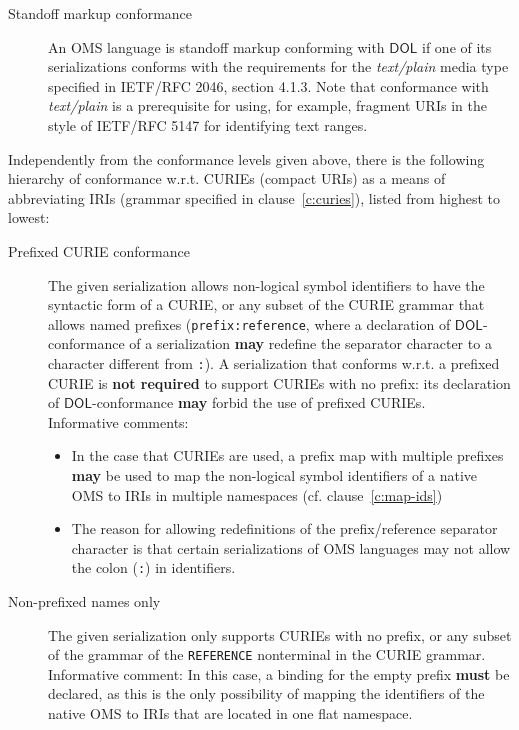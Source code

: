 \documentclass[10pt,fleqn,final]{scrreprt}
\makeatletter
\newcommand*{\cf}{cf.\@\xspace}
\newcommand*{\wrt}{w.r.t.\@\xspace}
\newcommand*\CommentAuthor{}
\renewcommand*\CommentAuthor{#1}}
\newcommand*\CommentDate{}
\renewcommand*\CommentDate{#1}}
\newcommand*\CommentId{}
\renewcommand*\CommentId{#1}}
\newcommand*\CommentType{}
\renewcommand*\CommentType{#1}}
\newcommand*{\SetCommentColorByType}[1]{%
\edef\localType{{#1}}%
\expandafter\ifstrequal\localType{q-aut}{\colorlet{CommentColor}{red}}{%
\expandafter\ifstrequal\localType{q-all}{\colorlet{CommentColor}{orange}}{%
\expandafter\ifstrequal\localType{todo}{\colorlet{CommentColor}{orange}}{%
\expandafter\ifstrequal\localType{fyi}{\colorlet{CommentColor}{lightgray}}{%
\colorlet{CommentColor}{yellow}}}}}}
\newcommand*{\SetCommentPrefixByType}[1]{%
\edef\localType{{#1}}%
\expandafter\@ifmtarg\localType{%
\edef\CommentPrefix{}%
}{%
\caseupper[q]{#1}%
\edef\CommentPrefix{\thestring: }%
}}
\newcommand*{\initComment}[1]{%
\setkeys{Comment}{#1}%
\SetCommentColorByType{\CommentType}%
\relax%
\SetCommentPrefixByType{\CommentType}%
\relax%
}
\newcommand*{\todonote}[2][]{%
\initComment{#1}%
\pdfcomment[author=\CommentAuthor,color=CommentColor,date=\CommentDate,id=\CommentId]{%
\CommentPrefix
#2}}
\renewcommand*{\todonote}[2][]{%
\initComment{#1}%
\ednote{\CommentPrefix #2}}
\newcommand*{\mimetype}[1]{\textit{#1}}
\newcommand*{\syntax}[1]{\texttt{#1}}
\newcommand*{\notrequired}{\textbf{not required}\xspace}
\newcommand*{\may}{\textbf{may}\xspace}
\newcommand*{\hasto}{\textbf{must}\xspace}
\newcommand*{\DOL}{\ensuremath{\mathsf{DOL}}\xspace}
\newcommand{\clauserefname}{clause}
\newcommand{\cref}[1]{\clauserefname~\ref{#1}}
\newcommand{\nisref}[1]{#1}
\makeatother
\begin{document}
\begin{description}
\item[Standoff markup conformance]
An OMS language is standoff markup conforming with \DOL if one of its serializations conforms with
the requirements for the \mimetype{text/plain} media type specified in \nisref{IETF/RFC 2046},
section 4.1.3.  Note that conformance with \mimetype{text/plain} is a prerequisite for using, for
example, fragment URIs in the style of \nisref{IETF/RFC 5147} for identifying text ranges.
\end{description}


Independently from the conformance levels given above, there is the following hierarchy of conformance \wrt CURIEs (compact URIs) as a means of abbreviating IRIs (grammar specified in \cref{c:curies}), listed from highest to lowest:
\begin{description}
\item[Prefixed CURIE conformance] The given serialization allows non-logical symbol identifiers to have the syntactic form of a CURIE, or any subset of the CURIE grammar that allows named prefixes (\syntax{prefix:reference}, where a declaration of \DOL-conformance of a serialization \may redefine the separator character to a character different from \syntax{:}).  A serialization that conforms \wrt a prefixed CURIE  is \notrequired to support CURIEs with no prefix: its declaration of \DOL-conformance \may forbid the use of prefixed CURIEs.\\
  Informative comments:
  \begin{itemize}
  \item In the case that CURIEs are used, a prefix map with multiple prefixes \may be used to map the non-logical symbol identifiers of a native OMS to IRIs in multiple namespaces (\cf \cref{c:map-ids})
  \item The reason for allowing redefinitions of the prefix/reference separator character is that certain serializations of OMS languages may not allow the colon (\syntax{:}) in identifiers.
  \end{itemize}
\item[Non-prefixed names only] The given serialization only supports CURIEs with no prefix, or any subset of the grammar of the \syntax{REFERENCE} nonterminal in the CURIE grammar.\\
  Informative comment: In this case, a binding for the empty prefix \hasto be declared, as this is the only possibility of mapping the identifiers of the native OMS to IRIs that are located in one flat namespace.
\end{description}
\end{document}
